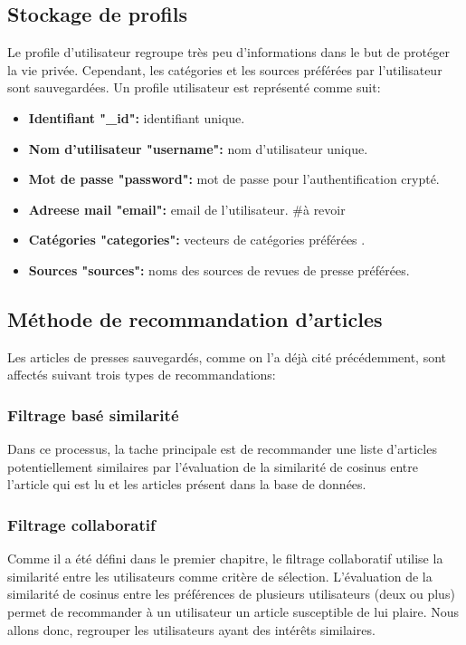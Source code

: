 \subsection{Stockage de profils}
Le profile d'utilisateur regroupe très peu d'informations dans le but de protéger la vie privée. Cependant, les catégories et les sources préférées par l'utilisateur sont sauvegardées. 
Un profile utilisateur est représenté comme suit:
\begin{itemize}
     \item \textbf{Identifiant "\_id": } identifiant unique.
     \item \textbf{Nom d'utilisateur "username": } nom d'utilisateur unique.
     \item \textbf{Mot de passe "password": } mot de passe pour l'authentification crypté.
     \item \textbf{Adreese mail "email": } email de l'utilisateur. \#à revoir
     \item \textbf{Catégories "categories": } vecteurs de catégories préférées .
     \item \textbf{Sources "sources": } noms des sources de revues de presse préférées.	
\end{itemize}

\subsection{Méthode de recommandation d'articles}
Les articles de presses sauvegardés, comme on l'a déjà cité précédemment, sont affectés suivant trois types de recommandations:
\subsubsection{Filtrage basé similarité}
Dans ce processus, la tache principale est de recommander une liste d'articles potentiellement similaires par l'évaluation de la similarité de cosinus entre l'article qui est lu et les articles présent dans la base de données.
\subsubsection{Filtrage collaboratif}
Comme il a été défini dans le premier chapitre, le filtrage collaboratif utilise la similarité entre les utilisateurs comme critère de sélection. L'évaluation de la similarité de cosinus entre les préférences de plusieurs utilisateurs (deux ou plus) permet de recommander à un utilisateur un article susceptible de lui plaire. 
Nous allons donc, regrouper les utilisateurs ayant des intérêts similaires.

